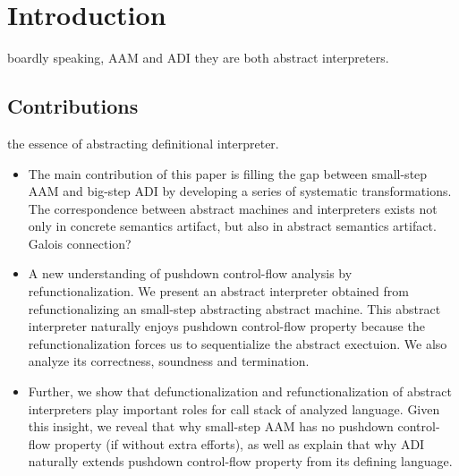 \documentclass[acmsmall,review,anonymous]{acmart}\settopmatter{printfolios=true,printccs=false,printacmref=false}
\begin{document}




\maketitle

\section{Introduction}

boardly speaking, AAM and ADI they are both abstract interpreters.

\subsection{Contributions}

the essence of abstracting definitional interpreter.

\begin{itemize}
\item The main contribution of this paper is filling the gap
  between small-step AAM and big-step ADI by developing a series of
  systematic transformations. 
  The correspondence between abstract
  machines and interpreters exists not only in concrete semantics artifact,
  but also in abstract semantics artifact.
  Galois connection?

\item A new understanding of pushdown control-flow analysis by 
  refunctionalization.
  We present an abstract interpreter obtained from refunctionalizing
  an small-step abstracting abstract machine. 
  This abstract interpreter naturally enjoys pushdown control-flow property
  because the refunctionalization forces us to sequentialize the 
  abstract exectuion.
  We also analyze its correctness, soundness and termination.

\item Further, we show that defunctionalization and refunctionalization
  of abstract interpreters play important roles for call stack of analyzed language.
  Given this insight, we reveal that why small-step AAM has no pushdown
  control-flow property (if without extra efforts), as well as explain
  that why ADI naturally extends pushdown control-flow property from its
  defining language.

\end{itemize}
\end{document}
